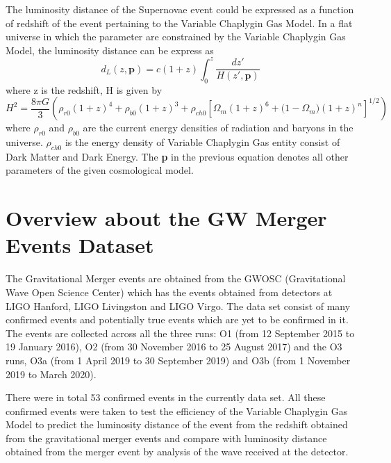 The luminosity distance of the Supernovae event could be expressed as a function of redshift of the event pertaining to the Variable Chaplygin Gas Model. In a flat universe in which the parameter are constrained by the Variable Chaplygin Gas Model, the luminosity distance can be express as  
\begin{equation}\label{3 Luminosity distance equation}
    d_L(z,\textbf{p}) = c{(1+z)}{\int_{0}^{z}\frac{dz'}{H(z',\textbf{p})}}
\end{equation}
where z is the redshift, H is given by 
\begin{equation}\label{3 H term}
    H^{2} = \frac{8{\pi}G}{3}({\rho_{r0}{(1+z)}^{4}+\rho_{b0}{(1+z)}^{3}+\rho_{ch0}{[{\Omega_{m}{(1+z)}^{6}+{(1-\Omega_{m}}){(1+z)}^{n}}]}^{1/2}})
\end{equation}
where $\rho_{r0}$ and $\rho_{b0}$ are the current energy densities of radiation and baryons in the universe. $\rho_{ch0}$ is the energy density of Variable Chaplygin Gas entity consist of Dark Matter and Dark Energy. The \textbf{p} in the previous equation denotes all other parameters of the given cosmological model.   

\section{Overview about the GW Merger Events Dataset}
The Gravitational Merger events are obtained from the GWOSC (Gravitational Wave Open Science Center) which has the events obtained from detectors at LIGO Hanford, LIGO Livingston and LIGO Virgo. The data set consist of many confirmed events and potentially true events which are yet to be confirmed in it. The events are collected across all the three runs: O1 (from 12 September 2015 to 19 January 2016), O2 (from 30 November 2016 to 25 August 2017) and the O3 runs, O3a (from 1 April 2019 to 30 September 2019) and O3b (from 1 November 2019 to March 2020).

There were in total 53 confirmed events in the currently data set. All these confirmed events were taken to test the efficiency of the Variable Chaplygin Gas Model to predict the luminosity distance of the event from the redshift obtained from the gravitational merger events and compare with luminosity distance obtained from the merger event by analysis of the wave received at the detector.

